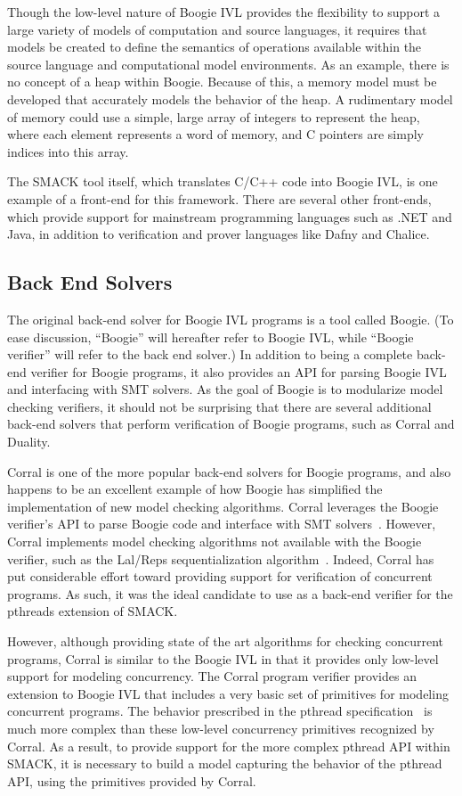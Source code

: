 Though the low-level nature of Boogie IVL provides the flexibility to
support a large variety of models of computation and source languages,
it requires that models be created to define the semantics of
operations available within the source language and computational
model environments.  As an example, there is no concept of a heap
within Boogie.  Because of this, a memory model must be developed that
accurately models the behavior of the heap.  A rudimentary model of
memory could use a simple, large array of integers to represent the
heap, where each element represents a word of memory, and C pointers
are simply indices into this array.

The SMACK tool itself, which translates C/C++ code into Boogie IVL, is
one example of a front-end for this framework.  There are several
other front-ends, which provide support for mainstream programming
languages such as .NET and Java, in addition to verification and
prover languages like Dafny and Chalice.

\subsection {Back End Solvers}
The original back-end solver for Boogie IVL programs is a tool called
Boogie.  (To ease discussion, ``Boogie'' will hereafter refer to
Boogie IVL, while ``Boogie verifier'' will refer to the back end
solver.)  In addition to being a complete back-end verifier for Boogie
programs, it also provides an API for parsing Boogie IVL and 
interfacing with SMT solvers. As the goal of Boogie is to modularize
model checking verifiers, it should not be surprising that there are
several additional back-end solvers that perform verification of
Boogie programs, such as Corral and Duality.  

Corral is one of the more popular back-end solvers for Boogie
programs, and also happens to be an excellent example of how Boogie
has simplified the implementation of new model checking algorithms.
Corral leverages the Boogie verifier's API to parse Boogie code and
interface with SMT solvers~\cite{corral}.  However, Corral implements
model checking algorithms not available with the Boogie verifier, such
as the Lal/Reps sequentialization algorithm~\cite{LalReps}. Indeed,
Corral has put considerable effort toward providing support for
verification of concurrent programs.  As such, it was the ideal
candidate to use as a back-end verifier for the pthreads extension of
SMACK. 

However, although providing state of the art algorithms for checking
concurrent programs, Corral is similar to the Boogie IVL in that it
provides only low-level support for modeling concurrency.  The Corral
program verifier provides an extension to Boogie IVL that includes a
very basic set of primitives for modeling concurrent programs.  The
behavior prescribed in the pthread specification~\cite{pthreads} is
much more complex than these low-level concurrency primitives
recognized by Corral.  As a result, to provide support for the more
complex pthread API within SMACK, it is necessary to build a model
capturing the behavior of the pthread API, using the primitives
provided by Corral. 


